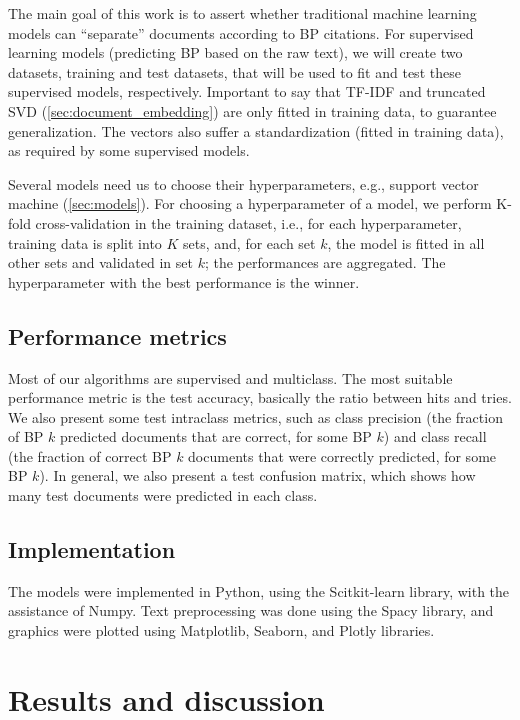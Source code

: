 \documentclass[twocolumn]{article}
\begin{document}
                  The main goal of this work is to assert whether traditional machine learning models can ``separate'' documents according to BP citations. For supervised learning models (predicting BP based on the raw text), we will create two datasets, training and test datasets, that will be used to fit and test these supervised models, respectively. Important to say that TF-IDF and truncated SVD (\autoref{sec:document_embedding}) are only fitted in training data, to guarantee generalization. The vectors also suffer a standardization (fitted in training data), as required by some supervised models.

                  Several models need us to choose their hyperparameters, e.g., support vector machine (\autoref{sec:models}). For choosing a hyperparameter of a model, we perform K-fold cross-validation in the training dataset, i.e., for each hyperparameter, training data is split into $K$ sets, and, for each set $k$, the model is fitted in all other sets and validated in set $k$; the performances are aggregated. The hyperparameter with the best performance is the winner.

            \subsection{Performance metrics}

                  Most of our algorithms are supervised and multiclass. The most suitable performance metric is the test accuracy, basically the ratio between hits and tries. We also present some test intraclass metrics, such as class precision (the fraction of BP $k$ predicted documents that are correct, for some BP $k$) and class recall (the fraction of correct BP $k$ documents that were correctly predicted, for some BP $k$). In general, we also present a test confusion matrix, which shows how many test documents were predicted in each class.

            \subsection{Implementation}

                  The models were implemented in Python, using the Scitkit-learn library, with the assistance of Numpy. Text preprocessing was done using the Spacy library, and graphics were plotted using Matplotlib, Seaborn, and Plotly libraries.

      \section{Results and discussion}
            \label{sec:results}

      \nocite{*}
      
      
\end{document}
